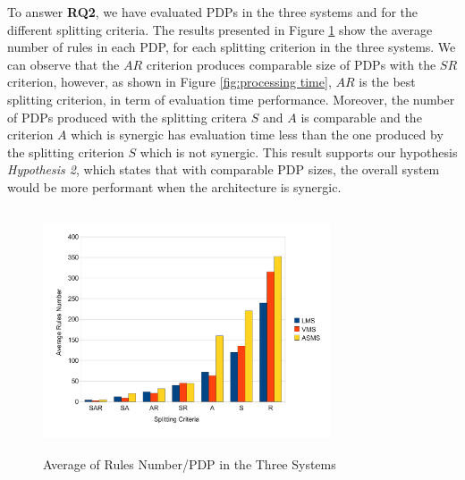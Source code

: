 To answer \textbf{RQ2}, we have evaluated PDPs in the three systems and for the different splitting criteria. The results presented in Figure 
\ref{average} show the average number of rules in each PDP, for each splitting criterion in the three systems. We can observe that the $AR$ 
criterion produces comparable size of PDPs with the $SR$ criterion, however, as shown in Figure 
\ref{fig:processing time}, $AR$ is the best splitting criterion, in term of evaluation time performance. 
Moreover, the number of PDPs produced with the splitting critera $S$ and $A$ is comparable and the criterion 
$A$ which is synergic has evaluation time less than the one produced by the splitting criterion $S$ which is not synergic.
This result supports our hypothesis \textit{Hypothesis 2}, which states that with comparable PDP sizes, the overall system would 
be more performant when the architecture is synergic.

\begin{figure}[!h]
\centering
\includegraphics[width=8.5cm, height=7.2cm]{averagerules.pdf}
\begin{center}
\caption{Average of Rules Number/PDP in the Three Systems}
\label{average}
\end{center}
\end{figure}

